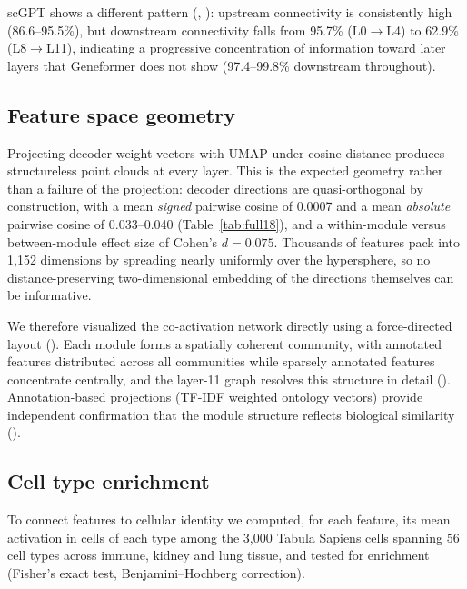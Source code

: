 \documentclass[onecolumn,11pt]{article}
\begin{document}
scGPT shows a different pattern (, ): upstream
connectivity is consistently high (86.6--95.5\%), but
downstream connectivity falls from 95.7\% (L0$\to$L4) to 62.9\% (L8$\to$L11), indicating a
progressive concentration of information toward later layers that Geneformer does not show
(97.4--99.8\% downstream throughout).

\subsection*{Feature space geometry}
\label{sec:geometry}

Projecting decoder weight vectors with UMAP under cosine distance produces structureless point
clouds at every layer. This is the expected geometry rather than a failure of the projection:
decoder directions are quasi-orthogonal by construction, with a mean \emph{signed} pairwise cosine
of 0.0007 and a mean \emph{absolute} pairwise cosine of 0.033--0.040 (Table~\ref{tab:full18}), and
a within-module versus between-module effect size of Cohen's $d = 0.075$. Thousands of features
pack into 1,152 dimensions by spreading nearly uniformly over the hypersphere, so no
distance-preserving two-dimensional embedding of the directions themselves can be informative.

We therefore visualized the co-activation network directly using a force-directed layout
(). Each module forms a spatially coherent community, with annotated
features distributed across all communities while sparsely annotated features concentrate centrally,
and the layer-11 graph resolves this structure in detail (). Annotation-based projections (TF-IDF weighted ontology vectors) provide independent
confirmation that the module structure reflects biological similarity
().

\subsection*{Cell type enrichment}
\label{sec:celltypes}

To connect features to cellular identity we computed, for each feature, its mean activation in
cells of each type among the 3,000 Tabula Sapiens cells spanning 56 cell types across immune,
kidney and lung tissue, and tested for enrichment (Fisher's exact test, Benjamini--Hochberg
correction).
\end{document}
